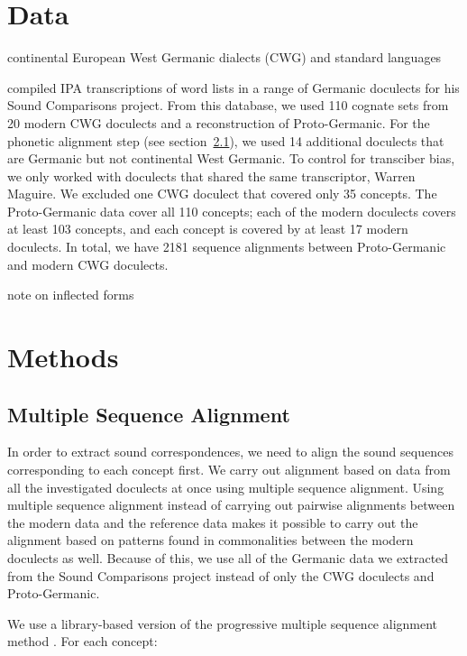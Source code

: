 \documentclass[a4paper]{article}
\begin{document}
\newpage
\section{Data}

continental European West Germanic dialects (CWG) and standard languages

\citet{heggarty2018sound} compiled IPA transcriptions of word lists in a range of Germanic doculects for his Sound Comparisons project.
From this database, we used 110 cognate sets from 20 modern CWG doculects and a reconstruction of Proto-Germanic.
For the phonetic alignment step (see section~\ref{s:alignments}), we used 14 additional doculects that are Germanic but not continental West Germanic. 
To control for transciber bias, we only worked with doculects that shared the same transcriptor, Warren Maguire.
We excluded one CWG doculect that covered only 35 concepts. %
The Proto-Germanic data cover all 110 concepts; each of the modern doculects covers at least 103 concepts, and each concept is covered by at least 17 modern doculects.
In total, we have 2181 sequence alignments between Proto-Germanic and modern CWG doculects.

note on inflected forms

\newpage
\section{Methods}

\subsection{Multiple Sequence Alignment}
\label{s:alignments}

In order to extract sound correspondences, we need to align the sound sequences corresponding to each concept first.
We carry out alignment based on data from all the investigated doculects at once using multiple sequence alignment.
Using multiple sequence alignment instead of carrying out pairwise alignments between the modern data and the reference data makes it possible to carry out the alignment based on patterns found in commonalities between the modern doculects as well.
Because of this, we use all of the Germanic data we extracted from the Sound Comparisons project instead of only the CWG doculects and Proto-Germanic.

We use a library-based version \citep{notredame2000t-coffee:} of the progressive multiple sequence alignment method \citep{thompson1994clustal}.
For each concept:
\end{document}
